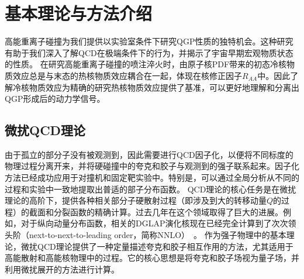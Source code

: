 
\chapter{基本理论与方法介绍}
	
	高能重离子碰撞为我们提供以实验室条件下研究QGP性质的独特机会。这种研究有助于我们深入了解QCD在极端条件下的行为，并揭示了宇宙早期宏观物质状态的性质。
	在研究高能重离子碰撞的喷注淬火时，由原子核PDF带来的初态冷核物质效应总是与末态的热核物质效应耦合在一起，体现在核修正因子$R_{AA}$中。因此了解冷核物质效应为精确的研究热核物质效应提供了基准，可以更好地理解和分离出QGP形成后的动力学信号。

	
\section{微扰QCD理论}
\label{sec:nlojet_cs}

	由于孤立的部分子没有被观测到，因此需要进行QCD因子化，以便将不同标度的物理过程分离开来，并将硬碰撞中的夸克和胶子与观测到的强子联系起来。因子化方法已经成功应用于对撞机和固定靶实验中。特别是，可以通过全局分析从不同的过程和实验中一致地提取出普适的部子分布函数。
	QCD理论的核心任务是在微扰理论的高阶下，提供各种相关部分子硬散射过程（即涉及到大的转移动量$Q$的过程）的截面和分裂函数的精确计算。过去几年在这个领域取得了巨大的进展。例如，对于纵向动量分布函数，相关的DGLAP演化核现在已经完全计算到了次次领头阶（next-to-next-to-leading order，简称NNLO）~\parencite{Moch:2014sna,Vogt:2004mw,Moch:2004pa}。
	作为强子物理中的基本理论，微扰QCD理论提供了一种定量描述夸克和胶子相互作用的方法，尤其适用于高能散射和高能核物理中的过程。它的核心思想是将夸克和胶子场视为量子场，并利用微扰展开的方法进行计算。

